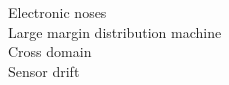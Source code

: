 \documentclass[a4paper]{cas-sc}
\begin{document}


\begin{keywords}
Electronic noses\\
Large margin distribution machine\\
Cross domain\\
Sensor drift

\end{keywords}

\maketitle

\end{document}
